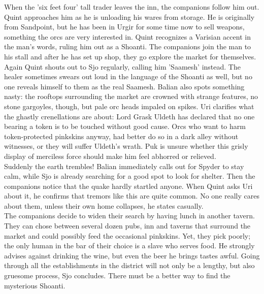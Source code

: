 When the 'six feet four' tall trader leaves the inn, the companions follow him out. Quint approaches him as he is unloading his wares from storage. He is originally from Sandpoint, but he has been in Urgir for some time now to sell weapons, something the orcs are very interested in. Quint recognizes a Varisian accent in the man's words, ruling him out as a Shoanti. The companions join the man to his stall and after he has set up shop, they go explore the market for themselves. Again Quint shouts out to Sjo regularly, calling him 'Saamesh' instead. The healer sometimes swears out loud in the language of the Shoanti as well, but no one reveals himself to them as the real Saamesh. Balian also spots something nasty: the rooftops surrounding the market are crowned with strange features, no stone gargoyles, though, but pale orc heads impaled on spikes. Uri clarifies what the ghastly crenellations are about: Lord Grask Uldeth has declared that no one bearing a token is to be touched without good cause. Orcs who want to harm token-protected pinkskins anyway, had better do so in a dark alley without witnesses, or they will suffer Uldeth's wrath. Puk is unsure whether this grisly display of merciless force should make him feel abhorred or relieved.\\

Suddenly the earth trembles! Balian immediately calls out for Spyder to stay calm, while Sjo is already searching for a good spot to look for shelter. Then the companions notice that the quake hardly startled anyone. When Quint asks Uri about it, he confirms that tremors like this are quite common. No one really cares about them, unless their own home collapses, he states casually.\\

The companions decide to widen their search by having lunch in another tavern. They can chose between several dozen pubs, inn and taverns that surround the market and could possibly feed the occasional pinkskins. Yet, they pick poorly; the only human in the bar of their choice is a slave who serves food. He strongly advises against drinking the wine, but even the beer he brings tastes awful. Going through all the establishments in the district will not only be a lengthy, but also gruesome process, Sjo concludes. There must be a better way to find the mysterious Shoanti.\\

